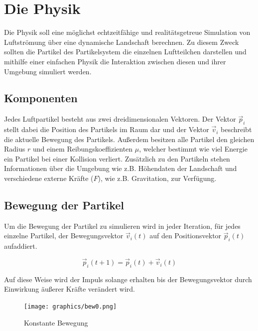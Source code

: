 \section{Die Physik}
\begin{Spacing}{\mylinespace}
    Die Physik soll eine möglichst echtzeitfähige und
    realitätsgetreue Simulation von Luftströmung über eine dynamische Landschaft berechnen.
    Zu diesem Zweck sollten die Partikel des Partikelsystem die einzelnen
    Luftteilchen darstellen und mithilfe einer einfachen Physik
    die Interaktion zwischen diesen und ihrer Umgebung simuliert werden.
    \subsection{Komponenten}
        Jedes Luftpartikel besteht aus zwei dreidimensionalen Vektoren.
        Der Vektor $\vec{p}_{i}$ stellt dabei die Position des Partikels im
        Raum dar und der Vektor $\vec{v}_{i}$ beschreibt die aktuelle Bewegung des Partikels.
        Außerdem besitzen alle Partikel den gleichen Radius $r$ und einem
        Reibungskoeffizienten $\mu$, welcher bestimmt wie viel Energie ein Partikel
        bei einer Kollision verliert.
        Zusätzlich zu den Partikeln stehen Informationen über die Umgebung
        wie z.B. Höhendaten der Landschaft und verschiedene externe
        Kräfte ($F$), wie z.B. Gravitation, zur Verfügung.



    \subsection{Bewegung der Partikel}
        Um die Bewegung der Partikel zu simulieren wird in jeder Iteration,
        für jedes einzelne Partikel, der Bewegungsvektor $\vec{v}_{i}(t)$
        auf den Positionsvektor $ \vec{p}_{i}(t)$ aufaddiert.

        \[ \vec{p}_{i}(t+1) = \vec{p}_{i}(t) + \vec{v}_{i}(t) \]

        Auf diese Weise wird der Impuls solange erhalten bis der Bewegungsvektor
        durch Einwirkung äußerer Kräfte verändert wird.

        \begin{figure}[h!]
			\centering
			\vspace*{30px}
			\texttt{[image: graphics/bew0.png]}
			\caption{Konstante Bewegung}
			\label{fig:BewegungPartikel}
		\end{figure}


\end{Spacing}
